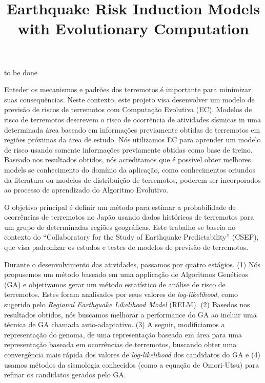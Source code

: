 \documentclass[bacharelado]{unb-cic}
\title{Earthquake Risk Induction Models with Evolutionary Computation}
\begin{document}
  \maketitle
  \pretextual

  \begin{agradecimentos}
  to be done
  \end{agradecimentos}
  \begin{resumo}
  Enteder os mecanismos e padrões dos terremotos é importante para minimizar suas consequências. Neste contexto, este projeto visa desenvolver um modelo de previsão de riscos de terremotos com Computação Evolutiva (EC). Modelos de risco de terremotos descrevem o risco de ocorrência de atividades sísmicas in uma determinada área baseado em informações previamente obtidas de terremotos em regiões próximas da área de estudo. Nós utilizamos EC para aprender um modelo de risco usando somente informações previamente obtidas como base de treino. Baseado nos resultados obtidos, nós acreditamos que é possível obter melhores models se conhecimento do domínio da aplicação, como conhecimentos oriundos da literatura ou modelos de distribuição de terremotos, poderem ser incorporados ao processo de aprendizado do Algoritmo Evolutivo.

  O objetivo principal é definir um método para estimar a probabilidade de ocorrências de terremotos no Japão usando dados históricos de terremotos para um grupo de determinadas regiões geográficas. Este trabalho se baseia no contexto do  “Collaboratory for the Study of Earthquake Predictability” (CSEP), que visa padronizar os estudos e testes de modelos de previsão de terremotos. 
  
  Durante o desenvolvimento das atividades, passamos por quatro estágios. (1) Nós propusemos um método baseado em uma applicação de Algoritmos Genéticos (GA) e objetivamos gerar um método estatístico de análise de risco de terremotos. Estes foram analisados por seus valores de \textit{log-likelihood}, como sugerido pelo \textit{Regional Earthquake Likelihood Model} (RELM). (2) Basedos nos resultados obtidos, nós buscamos melhorar a performance do GA ao incluir uma técnica de GA chamada auto-adaptativo. (3) A seguir, modificiamos a representação do genoma, de uma representação baseada em área para uma representação baseada em ocorrências de terremotos, buscando obter uma convergência mais rápida dos valores de \textit{log-likelihood} dos candidatos do GA e (4) usamos métodos da sismologia conhecidos (como a equação de Omori-Utsu) para refinar os candidatos gerados pelo GA.
  

\end{resumo}
\end{document}
